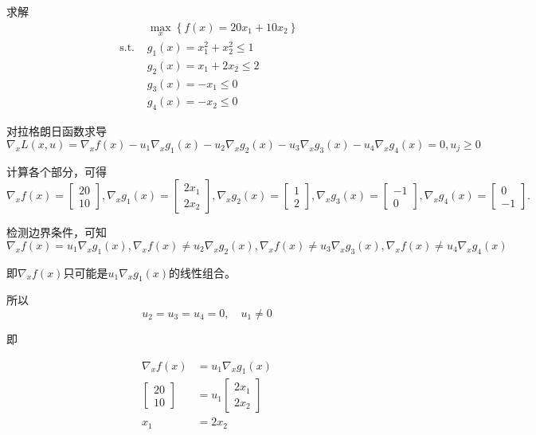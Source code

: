 \begin{problem}
    求解
$$
\begin{aligned}
    &\max _{x}\left\{f(x)=20 x_{1}+10 x_{2}\right\} \\
  \text{ s.t. }  &   g_{1}(x)=x_{1}^{2}+x_{2}^{2} \leq 1 \\
  & g_{2}(x)=x_{1}+2 x_{2} \leq 2 \\
  &  g_{3}(x)=-x_{1} \leq 0 \\
    & g_{4}(x)=-x_{2} \leq 0 
\end{aligned}
$$
\end{problem}

对拉格朗日函数求导
$$ \nabla_{x} L(x, u)=\nabla_{x} f(x)-u_{1} \nabla_{x} g_{1}(x)-u_{2} \nabla_{x} g_{2}(x)-u_{3} \nabla_{x} g_{3}(x)-u_{4} \nabla_{x} g_{4}(x)=0, u_{j} \geq 0 $$

计算各个部分，可得
$$ \nabla_{x} f(x)=\left[\begin{array}{c}20 \\ 10\end{array}\right], \nabla_{x} g_{1}(x)=\left[\begin{array}{c}2 x_{1} \\ 2 x_{2}\end{array}\right], \nabla_{x} g_{2}(x)=\left[\begin{array}{l}1 \\ 2\end{array}\right], \nabla_{x} g_{3}(x)=\left[\begin{array}{l}-1 \\ 0\end{array}\right], \nabla_{x} g_{4}(x)=\left[\begin{array}{l}0 \\ -1\end{array}\right] . $$

检测边界条件，可知
$$ \nabla_{x} f(x)=u_{1} \nabla_{x} g_{1}(x), \nabla_{x} f(x) \neq u_{2} \nabla_{x} g_{2}(x), \nabla_{x} f(x) \neq u_{3} \nabla_{x} g_{3}(x), \nabla_{x} f(x) \neq u_{4} \nabla_{x} g_{4}(x) $$

即$\nabla_{x} f(x)$只可能是$u_{1} \nabla_{x} g_{1}(x)$的线性组合。

所以
$$ u_{2}=u_{3}=u_{4}=0, \quad u_{1} \neq 0 $$

即

$$
\begin{aligned}
    \nabla_{x} f(x)&=u_{1} \nabla_{x} g_{1}(x)\\
\left[\begin{array}{c}
20 \\
10
\end{array}\right]&=u_{1}\left[\begin{array}{c}
2 x_{1} \\
2 x_{2}
\end{array}\right]\\
x_{1}&=2 x_{2} 
\end{aligned}
$$

